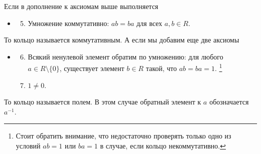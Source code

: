 \begin{definition}
Если в дополнение к аксиомам выше выполняется
\begin{itemize}
\item[]
\begin{enumerate}
\setcounter{enumi}{4}
\item Умножение коммутативно: $ab = ba$ для всех $a, b\in R$.
\end{enumerate}
\end{itemize}
То кольцо называется коммутативным.
А если мы добавим еще две аксиомы
\begin{itemize}
\item[]
\begin{enumerate}
\setcounter{enumi}{5}
\item Всякий ненулевой элемент обратим по умножению: для любого $a\in R\setminus\{0\}$, существует элемент $b\in R$ такой, что $ab = ba = 1$.%
\footnote{Стоит обратить внимание, что недостаточно проверять только одно из условий $ab = 1$ или $ba = 1$ в случае, если кольцо некоммутативно.}

\item $1 \neq 0$.
\end{enumerate}
\end{itemize}
То кольцо называется полем.
В этом случае обратный элемент к $a$ обозначается  $a^{-1}$.
\end{definition}

